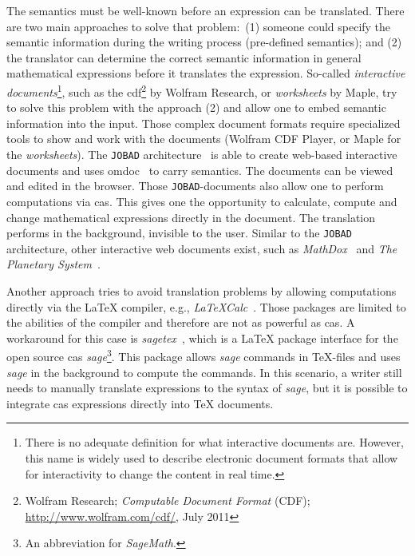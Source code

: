 \documentclass[a4paper,11pt]{article}
\newcommand{\Maple}{Maple}
\newcommand{\JOBAD}{{\tt JOBAD}}
\theoremstyle{defTheoStyle}
\theoremstyle{defExampStyle}
\begin{document}
	The semantics must be well-known before an expression can be translated. There are two main approaches to solve that problem:~(1) someone could specify the semantic information during the writing process (pre-defined semantics); and (2) the translator can determine the correct semantic information in general mathematical expressions before it translates the expression. So-called \textit{interactive documents}\footnote{There is no adequate definition for what interactive documents are. However, this name is widely used to describe electronic document formats that allow for interactivity to change the content in real time.}, such as the \gls*{cdf}\footnote{Wolfram Research; \textit{Computable Document Format} (CDF); \url{http://www.wolfram.com/cdf/}, July 2011} by Wolfram Research, or \textit{worksheets} by \Maple{}, try to solve this problem with the approach (2) and allow one to embed semantic information into the input. Those complex document formats require specialized tools to show and work with the documents (Wolfram CDF Player, or \Maple{} for the \textit{worksheets}). The \JOBAD{} architecture~\parencite{JOBAD:orig} is able to create web-based interactive documents and uses \gls*{omdoc}~\parencite{OMDoc} to carry semantics. The documents can be viewed and edited in the browser. Those \JOBAD{-documents} also allow one to perform computations via \gls*{cas}. This gives one the opportunity to calculate, compute and change mathematical expressions directly in the document. The translation performs in the background, invisible to the user. Similar to the \JOBAD{} architecture, other interactive web documents exist, such as \textit{MathDox}~\parencite{MathDox} and \textit{The Planetary System}~\parencite{Planetary}.
	
	Another approach tries to avoid translation problems by allowing computations directly via the \LaTeX{} compiler, e.g., \textit{LaTeXCalc}~\parencite{LatexCalc}. Those packages are limited to the abilities of the compiler and therefore are not as powerful as \gls*{cas}. A workaround for this case is \textit{sagetex}~\parencite{Sagetex}, which is a \LaTeX{} package interface for the open source \gls*{cas} \textit{sage}\footnote{An abbreviation for \textit{SageMath}.}. This package allows \textit{sage} commands in \TeX{-}files and uses \textit{sage} in the background to compute the commands. In this scenario, a writer still needs to manually translate expressions to the syntax of \textit{sage}, but it is possible to integrate \gls*{cas} expressions directly into \TeX{} documents.
	
\end{document}
